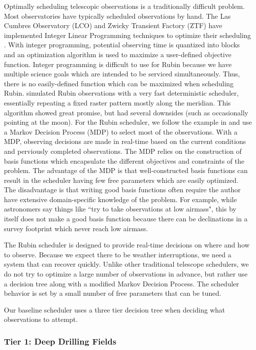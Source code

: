 Optimally scheduling telescopic observations is a traditionally difficult problem. Most observatories have typically scheduled observations by hand. The  Las Cumbres Observatory (LCO) and Zwicky Transient Factory (ZTF) have implemented Integer Linear Programming techniques to optimize their scheduling \citep{Lampoudi15, Bellm19}. With integer programming, potential observing time is quantized into blocks and an optimization algorithm is used to maximize a user-defined objective function.  Integer programming is difficult to use for Rubin because we have multiple science goals which are intended to be serviced simultaneously. Thus, there is no easily-defined function which can be maximized when scheduling Rubin. \citet{Rothchild19} simulated Rubin observations with a very fast deterministic scheduler, essentially repeating a fixed raster pattern mostly along the meridian. This algorithm showed great promise, but had several downsides (such as occasionally pointing at the moon). For the Rubin scheduler, we follow the example in \citet{Naghib19} and use a Markov Decision Process (MDP) to select most of the observations. With a MDP, observing decisions are made in real-time based on the current conditions and perviously completed observations. The MDP relies on the construction of basis functions which encapsulate the different objectives and constraints of the problem.  The advantage of the MDP is that well-constructed basis functions can result in the scheduler having few free parameters which are easily optimized. The disadvantage is that writing good basis functions often require the author have extensive domain-specific knowledge of the problem.  For example, while astronomers say things like ``try to take observations at low airmass", this by itself does not make a good basis function because there can be declinations in a survey footprint which never reach low airmass. 

The Rubin scheduler is designed to provide real-time decisions on where and how to observe. Because we expect there to be weather interruptions, we need a system that can recover quickly. Unlike other traditional telescope schedulers, we do not try to optimize a large number of observations in advance, but rather use a decision tree along with a modified Markov Decision Process. The scheduler behavior is set by a small number of free parameters that can be tuned.

Our baseline scheduler uses a three tier decision tree when deciding what observations to attempt. 

\subsubsection{Tier 1:  Deep Drilling Fields}

